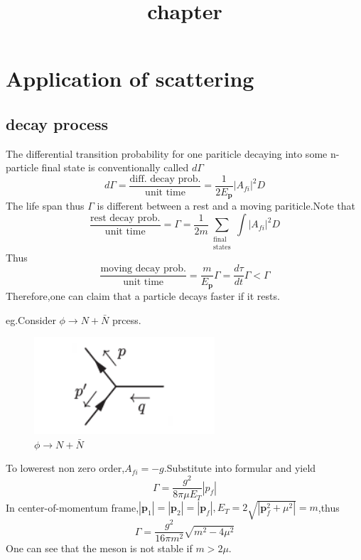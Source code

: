 \documentclass[a4paper]{article}
\begin{document}
	\title{chapter}
	\date{ }
	\maketitle
\section{Application of scattering}
\subsection{decay process}
The differential transition probability for one pariticle decaying into some n-particle final state is conventionally called $d\Gamma$ $$d\Gamma=\frac{\text{diff. decay prob.}}{\text{unit time}}=\frac{1}{2E_{\bm{p}}}|A_{fi}|^2D$$
The life span thus $\Gamma$ is different between a rest and
a moving pariticle.Note that$$\frac{\text{rest decay prob.}}{\text{unit time}}=\Gamma=\frac{1}{2m}\sum_{\substack{\text{final}\\ \text{states}}}\int |A_{fi}|^2 D$$Thus$$\frac{\text{moving decay prob.}}{\text{unit time}}=\frac{m}{E_{\bm{p}}}\Gamma=\frac{d\tau}{dt}\Gamma<\Gamma$$Therefore,one can claim that a particle decays faster if it rests.
\par eg.Consider $\phi\rightarrow N+\bar{N}$ prcess.
\begin{figure}[htbp]
	\centering
	\includegraphics[width=0.6\textwidth,height=0.1\textheight]{18.png}
	\caption{$\phi\rightarrow N+\bar{N}$}
\end{figure}
To lowerest non zero order,$A_{fi}=-g$.Substitute into formular and yield$$\Gamma=\frac{g^2}{8\pi\mu E_T}|p_f|$$In center-of-momentum frame,$|\bm{p}_1|=|\bm{p}_2|=|\bm{p}_f|,E_T=2\sqrt{|\bm{p}_f^2+\mu^2|}=m$,thus$$\Gamma=\frac{g^2}{16\pi m^2}\sqrt{m^2-4\mu^2}$$One can see that the meson is not stable if $m>2\mu$.
\end{document}
